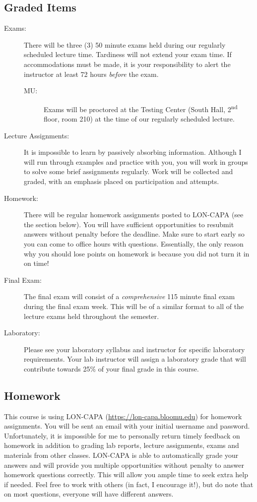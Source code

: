 \documentclass[11pt,letterpaper]{article}
\begin{document}
\subsection{Graded Items}
\begin{description}
	\item[Exams:] There will be three (3) 50 minute exams held during our
		regularly scheduled lecture time. Tardiness will not extend your
		exam time. If accommodations must be made, it is your
		responsibility to alert the instructor at least 72 hours
		\emph{before} the exam.
		\begin{description}
			\item[MU:] Exams will be proctored at the Testing Center (South
		Hall, 2\textsuperscript{nd} floor, room 210) at the time of our
		regularly scheduled lecture.
\end{description}
	\item[Lecture Assignments:] It is impossible to learn by passively
		absorbing information. Although I will run through examples and
		practice with you, you will work in groups to solve some brief
		assignments regularly. Work will be collected and graded, with
		an emphasis placed on participation and attempts.
	\item[Homework:] There will be regular homework assignments posted to
		LON-CAPA (see the  section below). You will have sufficient
		opportunities to resubmit answers without penalty before the
		deadline. Make sure to start early so you can come to office
		hours with questions. Essentially, the only reason why you
		should lose points on homework is because you did not turn it in
		on time!
	\item[Final Exam:] The final exam will consist of a \emph{comprehensive}
		115 minute final exam during the final exam week. This will be
		of a similar format to all of the lecture exams held throughout
		the semester.
	\item[Laboratory:] Please see your laboratory syllabus and instructor
		for specific laboratory requirements. Your lab instructor will
		assign a laboratory grade that will contribute towards 25\% of
		your final grade in this course.
\end{description}

\subsection{Homework}\label{homework}
This course is using LON-CAPA (\url{https://lon-capa.bloomu.edu}) for homework
assignments. You will be sent an email with your initial username and password.
Unfortunately, it is impossible for me to personally return timely feedback on
homework in addition to grading lab reports, lecture assignments, exams and
materials from other classes. LON-CAPA is able to automatically grade your
answers and will provide you multiple opportunities without penalty to answer
homework questions correctly. This will allow you ample time to seek extra help
if needed. Feel free to work with others (in fact, I encourage it!), but do note
that on most questions, everyone will have different answers.
\end{document}
